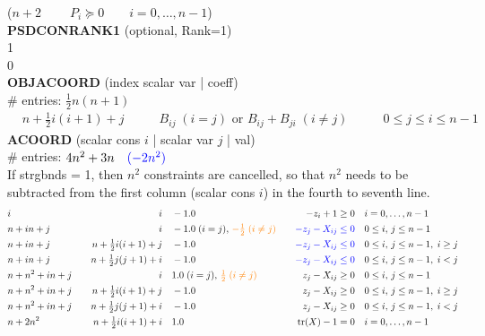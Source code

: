 \documentclass[11pt,a4paper]{article}
\DeclareMathOperator{\tr}{tr}
\theoremstyle{definition}
\begin{document}
{{\color{red}($n+2 \qquad \; P_i \succeq 0 \qquad i = 0,\dots,n-1$)} \\
{\color{green}\textbf{PSDCONRANK1} (optional, Rank=1) \\
1 \\
0\\}
\textbf{OBJACOORD} (index scalar var | coeff) \\
\# entries: $\tfrac{1}{2}n(n+1)$\\
\[
  \begin{aligned}
    &n+\tfrac{1}{2}i(i+1)+j \qquad & B_{ij} \; (i=j) \text{ or } B_{ij} +
    B_{ji} \; (i\neq j) \qquad & 0 \leq j \leq i \leq n-1
  \end{aligned}
\]
\textbf{ACOORD} (scalar cons $i$ | scalar var $j$ | val) \\
\# entries: $4n^2+3n \quad {\color{blue} (- 2n^2)}$ \\
{\color{blue} If strgbnds = 1, then $n^2$ constraints are cancelled, so
  that $n^2$ needs to be subtracted from the first column
  (scalar cons $i$) in the fourth to seventh line.}
\[
  \begin{aligned}
    & i \quad & i \quad & -1.0 \quad & -z_i + 1 \geq 0 \quad & i =
    0,\dots,n-1 \\
    & n+in+j \quad & i \quad & -1.0\; (i = j),\,
    {\color{orange} -\tfrac{1}{2}\; (i\neq j)} \quad & {\color{blue}-z_j -
      X_{ij} \leq 0}
    \quad & 0 \leq i,\, j \leq n-1\\
    & n+in+j \quad & n+\tfrac{1}{2}i(i+1)+j \quad & -1.0
    \quad & {\color{blue}-z_j - X_{ij} \leq 0} \quad & 0 \leq i,\, j \leq
    n-1, \; i \geq j \\
    & n+in+j \quad & n+\tfrac{1}{2}j(j+1)+i \quad & -1.0
    \quad & {\color{blue}-z_j - X_{ij} \leq 0} \quad & 0 \leq i,\, j \leq
    n-1, \; i < j \\
    & n+n^2+in+j \quad & i \quad & 1.0\; (i
    = j),\, {\color{orange} \tfrac{1}{2}\; (i\neq j)} \quad & z_j - X_{ij} \geq 0
    \quad & 0
    \leq i,\, j \leq n-1 \\
    & n+n^2+in+j \quad &
    n+\tfrac{1}{2}i(i+1)+j \quad & -1.0 \quad & z_j - X_{ij} \geq 0 \quad &
    0 \leq i,\, j \leq n-1,\; i \geq j \\
    & n+n^2+in+j \quad &
    n+\tfrac{1}{2}j(j+1)+i \quad & -1.0 \quad & z_j - X_{ij} \geq 0 \quad &
    0 \leq i,\, j \leq n-1,\; i < j \\
    & n+2n^2 \quad & n+\tfrac{1}{2}i(i+1)+i \quad & 1.0 \quad & \tr(X) -
    1 = 0 \quad & i = 0,\dots,n-1 \\

\end{aligned}\]}
\end{document}

